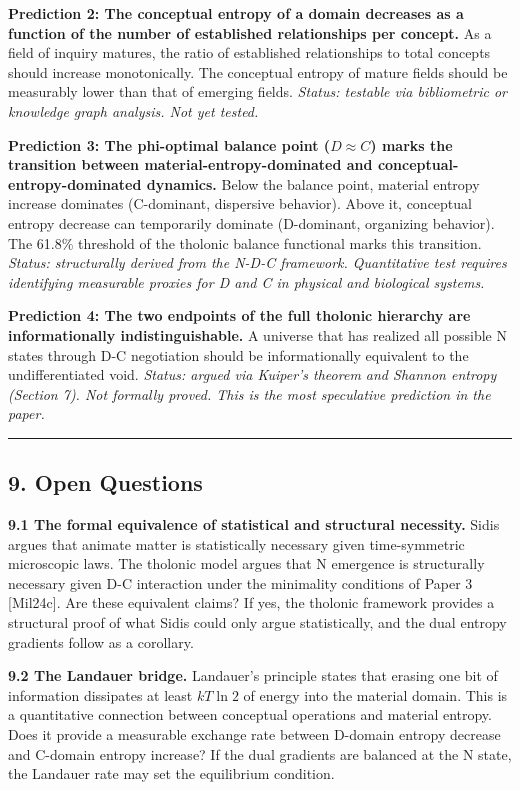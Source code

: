 \documentclass[
  11pt,
  letterpaper,
]{article}
\begin{document}
\textbf{Prediction 2: The conceptual entropy of a domain decreases as a
function of the number of established relationships per concept.} As a
field of inquiry matures, the ratio of established relationships to
total concepts should increase monotonically. The conceptual entropy of
mature fields should be measurably lower than that of emerging fields.
\emph{Status: testable via bibliometric or knowledge graph analysis. Not
yet tested.}

\textbf{Prediction 3: The phi-optimal balance point (\(D \approx C\))
marks the transition between material-entropy-dominated and
conceptual-entropy-dominated dynamics.} Below the balance point,
material entropy increase dominates (C-dominant, dispersive behavior).
Above it, conceptual entropy decrease can temporarily dominate
(D-dominant, organizing behavior). The 61.8\% threshold of the tholonic
balance functional marks this transition. \emph{Status: structurally
derived from the N-D-C framework. Quantitative test requires identifying
measurable proxies for D and C in physical and biological systems.}

\textbf{Prediction 4: The two endpoints of the full tholonic hierarchy
are informationally indistinguishable.} A universe that has realized all
possible N states through D-C negotiation should be informationally
equivalent to the undifferentiated void. \emph{Status: argued via
Kuiper's theorem and Shannon entropy (Section 7). Not formally proved.
This is the most speculative prediction in the paper.}

\begin{center}\rule{0.5\linewidth}{0.5pt}\end{center}

\subsection{9. Open Questions}\label{open-questions}

\textbf{9.1 The formal equivalence of statistical and structural
necessity.} Sidis argues that animate matter is statistically necessary
given time-symmetric microscopic laws. The tholonic model argues that N
emergence is structurally necessary given D-C interaction under the
minimality conditions of Paper 3 {[}Mil24c{]}. Are these equivalent
claims? If yes, the tholonic framework provides a structural proof of
what Sidis could only argue statistically, and the dual entropy
gradients follow as a corollary.

\textbf{9.2 The Landauer bridge.} Landauer's principle states that
erasing one bit of information dissipates at least \(kT \ln 2\) of
energy into the material domain. This is a quantitative connection
between conceptual operations and material entropy. Does it provide a
measurable exchange rate between D-domain entropy decrease and C-domain
entropy increase? If the dual gradients are balanced at the N state, the
Landauer rate may set the equilibrium condition.
\end{document}
